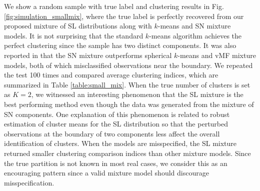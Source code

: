 \documentclass[10pt]{article}
\begin{document}
We show a random sample with true label and clustering results in Fig. \ref{fig:simulation_smallmix}, where the true label is perfectly recovered from our proposed mixture of SL distributions along with $k$-means and SN mixture models. It is not surprising that the standard $k$-means algorithm achieves the perfect clustering since the sample has two distinct components. It was also reported in \cite{you_2022_ParameterEstimationModelbased} that the SN mixture outperforms spherical $k$-means and vMF mixture models, both of which misclassified observations near the boundary. We repeated the test 100 times and compared average clustering indices, which are summarized in Table \ref{table:small_mix}. When the true number of clusters is set as $K=2$, we witnessed an interesting phenomenon that the SL mixture is the best performing method even though the data was generated from the mixture of SN components. One  explanation of this phenomenon is related to robust estimation of cluster means for the SL distribution so that the perturbed observations at the boundary of two components less affect the overall identification of clusters. When the models are misspecified, the SL mixture returned smaller clustering comparison indices than other mixture models. Since the true partition is not known in most real cases, we consider this as an encouraging pattern since a valid mixture model should discourage misspecification.
\end{document}
